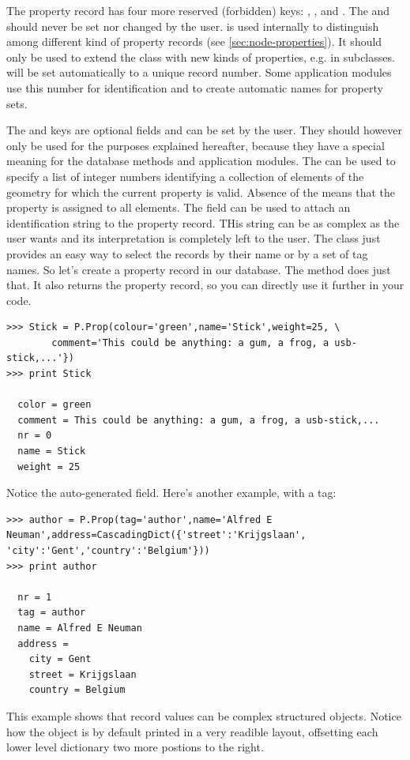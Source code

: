 The property record has four more reserved (forbidden) keys: , ,  and . The  and  should never be set nor changed by the user.  is used internally to distinguish among different kind of property records (see \ref{sec:node-properties}). It should only be used to extend the  class with new kinds of properties, e.g. in subclasses.  will be set automatically to a unique record number. Some application modules use this number for identification and to create automatic names for property sets. 

The  and  keys are optional fields and can be set by the user. They should however only be used for the purposes explained hereafter, because they have a special meaning for the database methods and application modules. The  can be used to specify a list of integer numbers identifying a collection of elements of the geometry for which the current property is valid. Absence of the  means that the property is assigned to all elements. The  field can be used to attach an identification string to the property record. THis string can be as complex as the user wants and its interpretation is completely left to the user. The  class just provides an easy way to select the records by their  name or by a set of tag names.  
So let's create a property record in our database. The  method does just that. It also returns the property record, so you can directly use it further in your code.
\begin{verbatim}
>>> Stick = P.Prop(colour='green',name='Stick',weight=25, \
        comment='This could be anything: a gum, a frog, a usb-stick,...'})
>>> print Stick

  color = green
  comment = This could be anything: a gum, a frog, a usb-stick,...
  nr = 0
  name = Stick
  weight = 25
\end{verbatim}
Notice the auto-generated  field. Here's another example, with a tag:
\begin{verbatim}
>>> author = P.Prop(tag='author',name='Alfred E Neuman',address=CascadingDict({'street':'Krijgslaan', 'city':'Gent','country':'Belgium'}))
>>> print author

  nr = 1
  tag = author
  name = Alfred E Neuman
  address = 
    city = Gent
    street = Krijgslaan
    country = Belgium
\end{verbatim}
This example shows that record values can be complex structured objects.
Notice how the \class{CascadingDict} object is by default printed in a very readible layout, offsetting each lower level dictionary two more postions to the right. 

